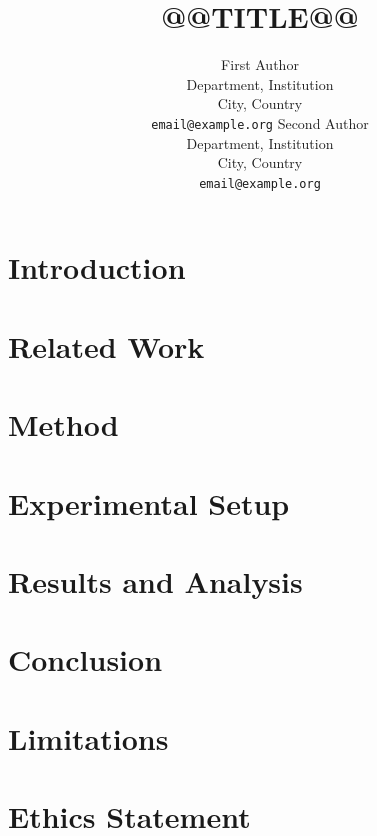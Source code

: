 \documentclass{article}
\title{@@TITLE@@}
\author{First Author \\ Department, Institution \\ City, Country \\ \texttt{email@example.org}
  \And Second Author \\ Department, Institution \\ City, Country \\ \texttt{email@example.org}}
\begin{document}
\maketitle

\begin{abstract}

\end{abstract}

\section{Introduction}\label{sec:intro}


\section{Related Work}\label{sec:related}


\section{Method}\label{sec:method}


\section{Experimental Setup}\label{sec:setup}


\section{Results and Analysis}\label{sec:results}


\section{Conclusion}\label{sec:conclusion}


\section*{Limitations}


\section*{Ethics Statement}

\end{document}
